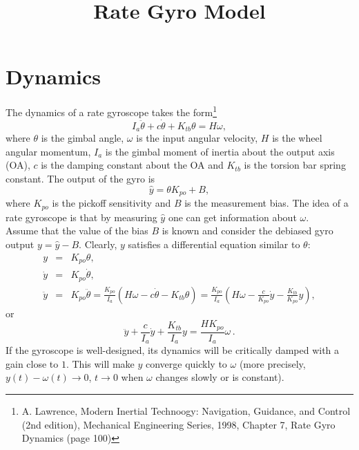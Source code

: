 \documentclass[a4paper]{article}
\begin{document}
\title{Rate Gyro Model}
\maketitle

\section{Dynamics}

The dynamics of a rate gyroscope  takes the
form\footnote{A. Lawrence, Modern Inertial Technoogy:
              Navigation, Guidance, and Control (2nd edition),
              Mechanical Engineering Series, 1998,
              Chapter 7, Rate Gyro Dynamics (page 100)}
\begin{equation}
\label{eq:dyn:gyro}
    I_a \ddot{\theta} + c \dot{\theta} + K_{tb} \theta = H \omega,
\end{equation}
where $\theta$ is the gimbal angle, $\omega$ is the input angular velocity,
$H$ is the wheel angular momentum, $I_a$ is the gimbal moment of inertia about
the output axis (OA), $c$ is the damping constant about the OA and $K_{tb}$ is
the torsion bar spring constant. The output of the gyro is
\begin{equation}
\label{eq:gyr:output}
    \hat{y} = \theta K_{po} + B,
\end{equation}
where $K_{po}$ is the pickoff sensitivity and $B$ is the measurement bias.
The idea of a rate gyroscope is that by measuring $\hat{y}$ one can get 
information about $\omega$. \\

Assume that the value of the bias $B$ is known
and consider the debiased gyro output $y = \hat{y} - B$.
Clearly, ${y}$ satisfies a differential equation similar to $\theta$:
\begin{eqnarray*}
    {y} &=& K_{po}\theta ,\\
    \dot{{y}} &=& K_{po} \dot{\theta},\\
    \ddot{{y}} &=& K_{po} \ddot{\theta} = \frac{K_{po}}{I_a} 
    (H\omega - c\dot{\theta} - K_{tb}\theta) 
    = \frac{K_{po}}{I_a} \left(H\omega - \frac{c}{K_{po}} 
      \dot{{y}} - \frac{K_{tb}}{K_{po}} y \right),
\end{eqnarray*}
or
\begin{equation}
\label{eq:gyro:harm1}
    \ddot{{y}} + \frac{c}{I_a} \dot{{y}} + \frac{K_{tb}}{I_a} {y} 
    = \frac{H K_{po}}{I_a} \omega \,.
\end{equation}
If the gyroscope is well-designed, its dynamics will be critically damped with 
a gain close to $1$. This will make $y$ converge quickly to $\omega$ (more 
precisely, $y(t)-\omega(t)\rightarrow 0$, $t\rightarrow 0$ when $\omega$ 
changes slowly or is constant). \\
\end{document}
